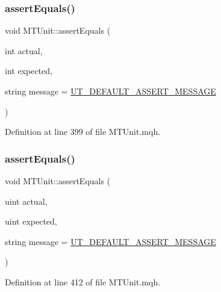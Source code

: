 \mbox{\label{class_m_t_unit_a52809992f236d526649345607300578f}} 
\subsubsection{\texorpdfstring{assert\+Equals()}{assertEquals()}\hspace{0.1cm}{\footnotesize\ttfamily [6/28]}}
{\footnotesize\ttfamily void M\+T\+Unit\+::assert\+Equals (\begin{DoxyParamCaption}\item[{int}]{actual,  }\item[{int}]{expected,  }\item[{string}]{message = {\ttfamily \mbox{\hyperlink{_m_t_unit_8mqh_a96f5d62188d09039ebc3f443c9120e39}{U\+T\+\_\+\+D\+E\+F\+A\+U\+L\+T\+\_\+\+A\+S\+S\+E\+R\+T\+\_\+\+M\+E\+S\+S\+A\+GE}}} }\end{DoxyParamCaption})}



Definition at line 399 of file M\+T\+Unit.\+mqh.

\mbox{\label{class_m_t_unit_a4f4dcab7c86fb9dac429e652d929cc48}} 
\subsubsection{\texorpdfstring{assert\+Equals()}{assertEquals()}\hspace{0.1cm}{\footnotesize\ttfamily [7/28]}}
{\footnotesize\ttfamily void M\+T\+Unit\+::assert\+Equals (\begin{DoxyParamCaption}\item[{uint}]{actual,  }\item[{uint}]{expected,  }\item[{string}]{message = {\ttfamily \mbox{\hyperlink{_m_t_unit_8mqh_a96f5d62188d09039ebc3f443c9120e39}{U\+T\+\_\+\+D\+E\+F\+A\+U\+L\+T\+\_\+\+A\+S\+S\+E\+R\+T\+\_\+\+M\+E\+S\+S\+A\+GE}}} }\end{DoxyParamCaption})}



Definition at line 412 of file M\+T\+Unit.\+mqh.

\mbox{\label{class_m_t_unit_af60409d2750fb2ae0d3b0a32c475a3b0}} 
